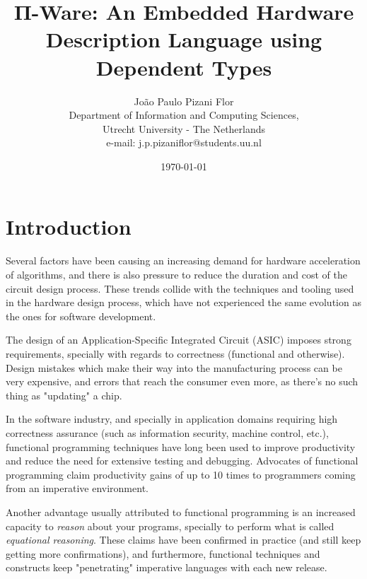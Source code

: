 \documentclass[a4paper,draft]{report}
\title{Π-Ware: An Embedded Hardware Description Language using Dependent Types}
\date{\today}
\author{
    João Paulo Pizani Flor \\
    Department of Information and Computing Sciences, \\
    Utrecht University - The Netherlands \\
    e-mail: j.p.pizaniflor@students.uu.nl
}
\begin{document}
    \maketitle


    \chapter{Introduction}
    \label{chap:intro}

        Several factors have been causing an increasing demand for hardware acceleration of algorithms,
        and there is also pressure to reduce the duration and cost of the circuit design process.
        These trends collide with the techniques and tooling used in the hardware design process,
        which have not experienced the same evolution as the ones for software development.

        The design of an Application-Specific Integrated Circuit (ASIC) imposes strong requirements,
        specially with regards to correctness (functional and otherwise).
        Design mistakes which make their way into the manufacturing process can be very expensive,
        and errors that reach the consumer even more, as there's no such thing as "updating" a chip.

        In the software industry, and specially in application domains requiring high correctness
        assurance (such as information security, machine control, etc.),
        functional programming techniques have long been used to improve productivity
        and reduce the need for extensive testing and debugging.
        Advocates of functional programming claim productivity gains of up to 10 times to
        programmers coming from an imperative environment.

        Another advantage usually attributed to functional programming is an increased capacity to
        \emph{reason} about your programs, specially to perform what is called \emph{equational reasoning}.
        These claims have been confirmed in practice (and still keep getting more confirmations),
        and furthermore, functional techniques and constructs keep "penetrating" imperative languages
        with each new release. %

\end{document}
